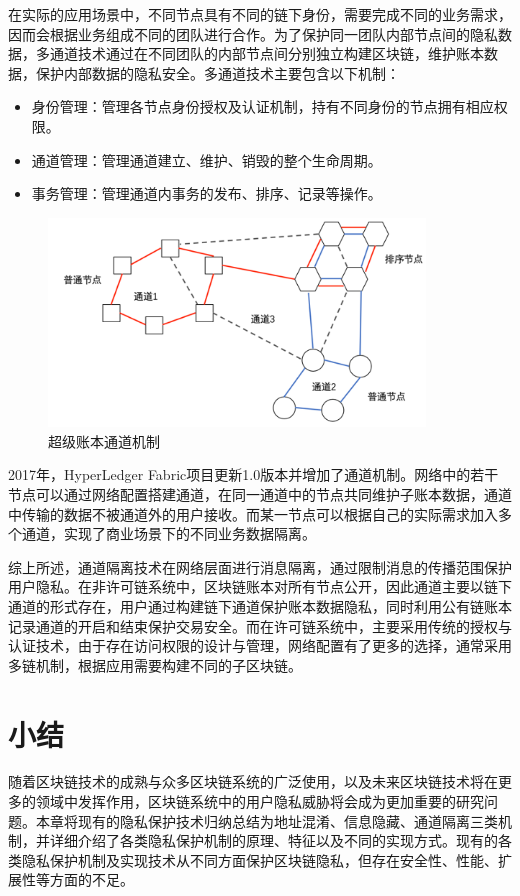 在实际的应用场景中，不同节点具有不同的链下身份，需要完成不同的业务需求，因而会根据业务组成不同的团队进行合作。为了保护同一团队内部节点间的隐私数据，多通道技术通过在不同团队的内部节点间分别独立构建区块链，维护账本数据，保护内部数据的隐私安全。多通道技术主要包含以下机制：

\begin{itemize}
	\item 身份管理：管理各节点身份授权及认证机制，持有不同身份的节点拥有相应权限。
	\item 通道管理：管理通道建立、维护、销毁的整个生命周期。
	\item 事务管理：管理通道内事务的发布、排序、记录等操作。
\end{itemize}

\begin{figure}
\centering
\includegraphics[width=10cm]{figures/hyper-channel.png}
\caption{超级账本通道机制}
\label{fig:hyper-channel}
\end{figure}

2017年，HyperLedger Fabric项目更新1.0版本并增加了通道机制。网络中的若干节点可以通过网络配置搭建通道，在同一通道中的节点共同维护子账本数据，通道中传输的数据不被通道外的用户接收。而某一节点可以根据自己的实际需求加入多个通道，实现了商业场景下的不同业务数据隔离。

综上所述，通道隔离技术在网络层面进行消息隔离，通过限制消息的传播范围保护用户隐私。在非许可链系统中，区块链账本对所有节点公开，因此通道主要以链下通道的形式存在，用户通过构建链下通道保护账本数据隐私，同时利用公有链账本记录通道的开启和结束保护交易安全。而在许可链系统中，主要采用传统的授权与认证技术，由于存在访问权限的设计与管理，网络配置有了更多的选择，通常采用多链机制，根据应用需要构建不同的子区块链。

\section{小结}

随着区块链技术的成熟与众多区块链系统的广泛使用，以及未来区块链技术将在更多的领域中发挥作用，区块链系统中的用户隐私威胁将会成为更加重要的研究问题。本章将现有的隐私保护技术归纳总结为地址混淆、信息隐藏、通道隔离三类机制，并详细介绍了各类隐私保护机制的原理、特征以及不同的实现方式。现有的各类隐私保护机制及实现技术从不同方面保护区块链隐私，但存在安全性、性能、扩展性等方面的不足。
